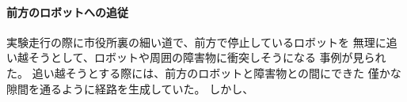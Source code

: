 \paragraph{前方のロボットへの追従}
実験走行の際に市役所裏の細い道で、前方で停止しているロボットを
無理に追い越そうとして、ロボットや周囲の障害物に衝突しそうになる
事例が見られた。
追い越そうとする際には、前方のロボットと障害物との間にできた
僅かな隙間を通るように経路を生成していた。
しかし、



% 

